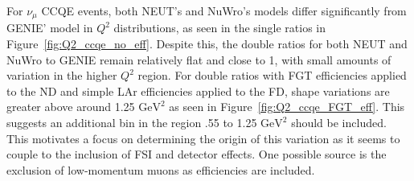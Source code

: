 \documentclass[12pt]{article}
\begin{document}
For $\nu_{\mu}$ CCQE events, both NEUT's and NuWro's models differ significantly from GENIE' model in $Q^2$ distributions, as seen in the single ratios in Figure~\ref{fig:Q2_ccqe_no_eff}. Despite this, the double ratios for both NEUT and NuWro to GENIE remain relatively flat and close to 1, with small amounts of variation in the higher $Q^2$ region. For double ratios with FGT efficiencies applied to the ND and simple LAr efficiencies applied to the FD, shape variations are greater above around 1.25 $\textrm{GeV}^2$ as seen in Figure~\ref{fig:Q2_ccqe_FGT_eff}. This suggests an additional bin in the region .55 to 1.25 $\textrm{GeV}^2$ should be included. This motivates a focus on determining the origin of this variation as it seems to couple to the inclusion of FSI and detector effects. One possible source is the exclusion of low-momentum muons as efficiencies are included.
\end{document}

